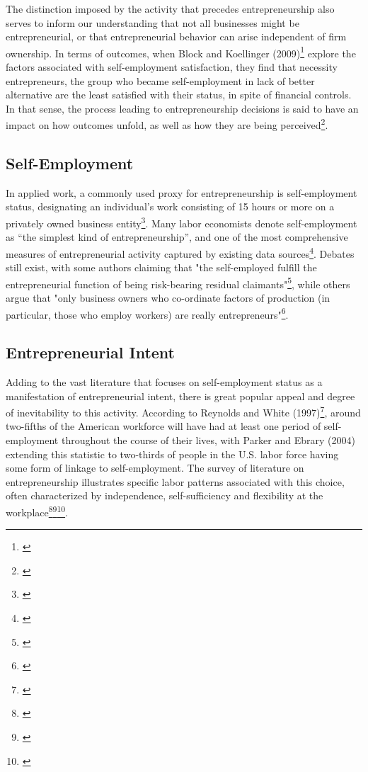 The distinction imposed by the activity that precedes entrepreneurship also serves to inform our understanding that not all businesses might be entrepreneurial, or that entrepreneurial behavior can arise independent of firm ownership. In terms of outcomes, when Block and Koellinger (2009)\footnote{\cite{BlockKoellinger2009}} explore the factors associated with self-employment satisfaction, they find that necessity entrepreneurs, the group who became self-employment in lack of better alternative are the least satisfied with their status, in spite of financial controls. In that sense, the process leading to entrepreneurship decisions is said to have an impact on how outcomes unfold, as well as how they are being perceived\footnote{\cite{BlockKoellinger2009}}.

\subsection{Self-Employment}

In applied work, a commonly used proxy for entrepreneurship is self-employment status, designating an individual's work consisting of 15 hours or more on a privately owned business entity\footnote{\cite{BlanchflowerOswald1998}}. Many labor economists denote self-employment as ``the simplest kind of entrepreneurship'', and one of the most comprehensive measures of entrepreneurial activity captured by existing data sources\footnote{\cite{Parker2004}}. Debates still exist, with some authors claiming that "the self-employed fulfill the entrepreneurial function of being risk-bearing residual claimants"\footnote{\cite[Page 5]{Parker2004}}, while others argue that "only business owners who co-ordinate factors of production (in particular, those who employ workers) are really entrepreneurs"\footnote{\cite[Page 5]{Parker2004}}.

\subsection{Entrepreneurial Intent}

Adding to the vast literature that focuses on self-employment status as a manifestation of entrepreneurial intent, there is great popular appeal and degree of inevitability to this activity. According to Reynolds and White (1997)\footnote{\cite{ReynoldsWhite1997}}, around two-fifths of the American workforce will have had at least one period of self-employment throughout the course of their lives, with Parker and Ebrary (2004) extending this statistic to two-thirds of people in the U.S. labor force having some form of linkage to self-employment. The survey of literature on entrepreneurship illustrates specific labor patterns associated with this choice, often characterized by independence, self-sufficiency and flexibility at the workplace\footnote{\cite{RodrguezFierroGarridoNavarro2015}}\hspace{.15em}\footnote{\cite{Parker2004}}\hspace{.15em}\footnote{\cite{Quinn1980}}. 

